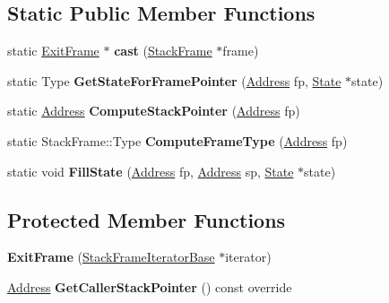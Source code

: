 \subsection*{Static Public Member Functions}
\begin{DoxyCompactItemize}
\item 
\mbox{\label{classv8_1_1internal_1_1ExitFrame_a6cfb53b1f5eb6913010c446e7813f825}} 
static \mbox{\hyperlink{classv8_1_1internal_1_1ExitFrame}{Exit\+Frame}} $\ast$ {\bfseries cast} (\mbox{\hyperlink{classv8_1_1internal_1_1StackFrame}{Stack\+Frame}} $\ast$frame)
\item 
\mbox{\label{classv8_1_1internal_1_1ExitFrame_af0f367c49f10592cba56310be5d6f7b6}} 
static Type {\bfseries Get\+State\+For\+Frame\+Pointer} (\mbox{\hyperlink{classuintptr__t}{Address}} fp, \mbox{\hyperlink{structv8_1_1internal_1_1StackFrame_1_1State}{State}} $\ast$state)
\item 
\mbox{\label{classv8_1_1internal_1_1ExitFrame_a68645e1e5b7b6014d97a50dd8434ac29}} 
static \mbox{\hyperlink{classuintptr__t}{Address}} {\bfseries Compute\+Stack\+Pointer} (\mbox{\hyperlink{classuintptr__t}{Address}} fp)
\item 
\mbox{\label{classv8_1_1internal_1_1ExitFrame_a158678bd502c5acce98e62135a3a8e30}} 
static Stack\+Frame\+::\+Type {\bfseries Compute\+Frame\+Type} (\mbox{\hyperlink{classuintptr__t}{Address}} fp)
\item 
\mbox{\label{classv8_1_1internal_1_1ExitFrame_a1c3835075d1f0f6b8b31896ca89f1a77}} 
static void {\bfseries Fill\+State} (\mbox{\hyperlink{classuintptr__t}{Address}} fp, \mbox{\hyperlink{classuintptr__t}{Address}} sp, \mbox{\hyperlink{structv8_1_1internal_1_1StackFrame_1_1State}{State}} $\ast$state)
\end{DoxyCompactItemize}
\subsection*{Protected Member Functions}
\begin{DoxyCompactItemize}
\item 
\mbox{\label{classv8_1_1internal_1_1ExitFrame_a0664071bd3448a6cd032da63b6fafbe5}} 
{\bfseries Exit\+Frame} (\mbox{\hyperlink{classv8_1_1internal_1_1StackFrameIteratorBase}{Stack\+Frame\+Iterator\+Base}} $\ast$iterator)
\item 
\mbox{\label{classv8_1_1internal_1_1ExitFrame_a1ce2e57a6f5494d5cdfb59fcd3315df1}} 
\mbox{\hyperlink{classuintptr__t}{Address}} {\bfseries Get\+Caller\+Stack\+Pointer} () const override
\end{DoxyCompactItemize}
